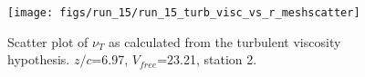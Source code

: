 \begin{figure}[H]
\centering
\texttt{[image: figs/run\_15/run\_15\_turb\_visc\_vs\_r\_meshscatter]}
\caption{Scatter plot of $\nu_T$ as calculated from the turbulent viscosity hypothesis. $z/c$=6.97, $V_{free}$=23.21, station 2.}
\label{fig:run_15_turb_visc_vs_r_meshscatter}
\end{figure}


